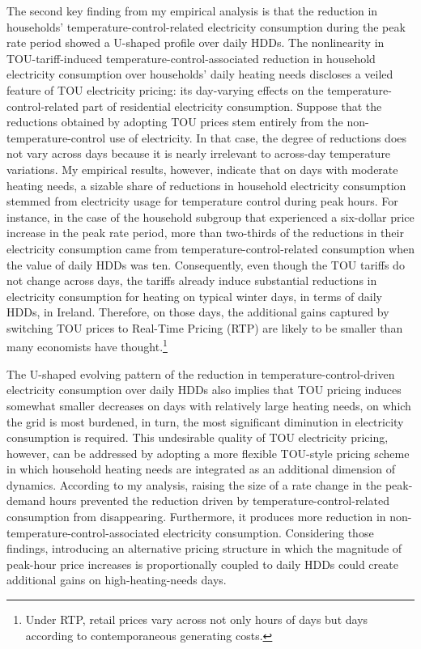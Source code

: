 The second key finding from my empirical analysis is that the reduction in households' temperature-control-related electricity consumption during the peak rate period showed a U-shaped profile over daily HDDs. The nonlinearity in TOU-tariff-induced temperature-control-associated reduction in household electricity consumption over households' daily heating needs discloses a veiled feature of TOU electricity pricing: its day-varying effects on the temperature-control-related part of residential electricity consumption. Suppose that the reductions obtained by adopting TOU prices stem entirely from the non-temperature-control use of electricity. In that case, the degree of reductions does not vary across days because it is nearly irrelevant to across-day temperature variations. My empirical results, however, indicate that on days with moderate heating needs, a sizable share of reductions in household electricity consumption stemmed from electricity usage for temperature control during peak hours. For instance, in the case of the household subgroup that experienced a six-dollar price increase in the peak rate period, more than two-thirds of the reductions in their electricity consumption came from temperature-control-related consumption when the value of daily HDDs was ten. Consequently, even though the TOU tariffs do not change across days, the tariffs already induce substantial reductions in electricity consumption for heating on typical winter days, in terms of daily HDDs, in Ireland. Therefore, on those days, the additional gains captured by switching TOU prices to Real-Time Pricing (RTP) are likely to be smaller than many economists have thought.\footnote{Under RTP, retail prices vary across not only hours of days but days according to contemporaneous generating costs.} 

The U-shaped evolving pattern of the reduction in temperature-control-driven electricity consumption over daily HDDs also implies that TOU pricing induces somewhat smaller decreases on days with relatively large heating needs, on which the grid is most burdened, in turn, the most significant diminution in electricity consumption is required. This undesirable quality of TOU electricity pricing, however, can be addressed by adopting a more flexible TOU-style pricing scheme in which household heating needs are integrated as an additional dimension of dynamics. According to my analysis, raising the size of a rate change in the peak-demand hours prevented the reduction driven by temperature-control-related consumption from disappearing. Furthermore, it produces more reduction in non-temperature-control-associated electricity consumption. Considering those findings, introducing an alternative pricing structure in which the magnitude of peak-hour price increases is proportionally coupled to daily HDDs could create additional gains on high-heating-needs days. 


